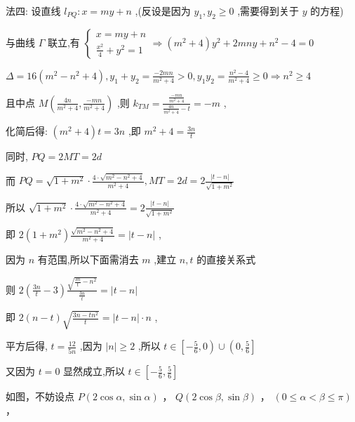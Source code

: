 \documentclass[10pt]{article}
\begin{document}
法四: 设直线 \({l}_{PQ} : x = {my} + n\) ,(反设是因为 \({y}_{1},{y}_{2} \geq  0\) ,需要得到关于 \(y\) 的方程)

与曲线 \(\Gamma\) 联立,有 \(\left\{  {\begin{array}{l} x = {my} + n \\  \frac{{x}^{2}}{4} + {y}^{2} = 1 \end{array} \Rightarrow  \left( {{m}^{2} + 4}\right) {y}^{2} + {2mny} + {n}^{2} - 4 = 0}\right.\)

\(\Delta  = {16}\left( {{m}^{2} - {n}^{2} + 4}\right) ,{y}_{1} + {y}_{2} = \frac{-{2mn}}{{m}^{2} + 4} > 0,{y}_{1}{y}_{2} = \frac{{n}^{2} - 4}{{m}^{2} + 4} \geq  0 \Rightarrow  {n}^{2} \geq  4\)

且中点 \(M\left( {\frac{4n}{{m}^{2} + 4},\frac{-{mn}}{{m}^{2} + 4}}\right)\) ,则 \({k}_{TM} = \frac{\frac{-{mn}}{{m}^{2} + 4}}{\frac{4n}{{m}^{2} + 4} - t} =  - m\) ,

化简后得: \(\left( {{m}^{2} + 4}\right) t = {3n}\) ,即 \({m}^{2} + 4 = \frac{3n}{t}\)

同时, \({PQ} = {2MT} = {2d}\)

而 \({PQ} = \sqrt{1 + {m}^{2}} \cdot  \frac{4 \cdot  \sqrt{{m}^{2} - {n}^{2} + 4}}{{m}^{2} + 4},{MT} = {2d} = 2\frac{\left| t - n\right| }{\sqrt{1 + {m}^{2}}}\)

所以 \(\sqrt{1 + {m}^{2}} \cdot  \frac{4 \cdot  \sqrt{{m}^{2} - {n}^{2} + 4}}{{m}^{2} + 4} = 2\frac{\left| t - n\right| }{\sqrt{1 + {m}^{2}}}\)

即 \(2\left( {1 + {m}^{2}}\right) \frac{\sqrt{{m}^{2} - {n}^{2} + 4}}{{m}^{2} + 4} = \left| {t - n}\right|\) ,

因为 \(n\) 有范围,所以下面需消去 \(m\) ,建立 \(n,t\) 的直接关系式

则 \(2\left( {\frac{3n}{t} - 3}\right) \frac{\sqrt{\frac{3n}{t} - {n}^{2}}}{\frac{3n}{t}} = \left| {t - n}\right|\)

即 \(2\left( {n - t}\right) \sqrt{\frac{{3n} - t{n}^{2}}{t}} = \left| {t - n}\right|  \cdot  n\) ,

平方后得, \(t = \frac{12}{5n}\) ,因为 \(\left| n\right|  \geq  2\) ,所以 \(t \in  \left\lbrack  {-\frac{5}{6},0}\right)  \cup  \left( {0,\frac{5}{6}}\right\rbrack\)

又因为 \(t = 0\) 显然成立,所以 \(t \in  \left\lbrack  {-\frac{5}{6},\frac{5}{6}}\right\rbrack\)

如图，不妨设点 \(P\left( {2\cos \alpha ,\sin \alpha }\right)\) ， \(Q\left( {2\cos \beta ,\sin \beta }\right)\) ， \(\left( {0 \leq  \alpha  < \beta  \leq  \pi }\right)\) ，
\end{document}
